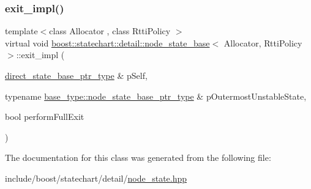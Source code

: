 \subsubsection{\texorpdfstring{exit\+\_\+impl()}{exit\_impl()}}
{\footnotesize\ttfamily template$<$class Allocator , class Rtti\+Policy $>$ \\
virtual void \mbox{\hyperlink{classboost_1_1statechart_1_1detail_1_1node__state__base}{boost\+::statechart\+::detail\+::node\+\_\+state\+\_\+base}}$<$ Allocator, Rtti\+Policy $>$\+::exit\+\_\+impl (\begin{DoxyParamCaption}\item[{\mbox{\hyperlink{classboost_1_1statechart_1_1detail_1_1node__state__base_a52fa5db06246a5d37b5980aa378fa41c}{direct\+\_\+state\+\_\+base\+\_\+ptr\+\_\+type}} \&}]{p\+Self,  }\item[{typename \mbox{\hyperlink{classboost_1_1statechart_1_1detail_1_1state__base_a8e3dd0f80bf95d7df21417a50f1dbaa1}{base\+\_\+type\+::node\+\_\+state\+\_\+base\+\_\+ptr\+\_\+type}} \&}]{p\+Outermost\+Unstable\+State,  }\item[{bool}]{perform\+Full\+Exit }\end{DoxyParamCaption})\hspace{0.3cm}{\ttfamily [pure virtual]}}



The documentation for this class was generated from the following file\+:\begin{DoxyCompactItemize}
\item 
include/boost/statechart/detail/\mbox{\hyperlink{node__state_8hpp}{node\+\_\+state.\+hpp}}\end{DoxyCompactItemize}
